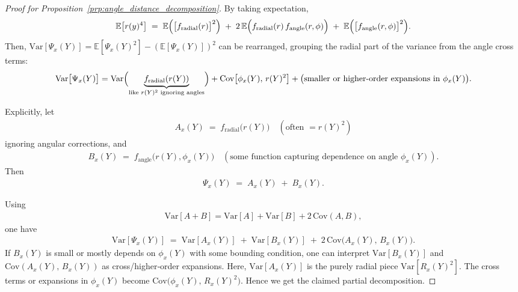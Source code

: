 \begin{proof}[Proof for Proposition~\ref{prp:angle_distance_decomposition}]
    By taking expectation,
    \begin{align*}
        \mathbb{E}\bigl[r(y)^4\bigr]
        \;=\;
        \mathbb{E}\Bigl(\bigl[f_{\mathrm{radial}}(r)\bigr]^2\Bigr)
        \;+\;
        2\,\mathbb{E}\Bigl( f_{\mathrm{radial}}(r)\,f_{\mathrm{angle}}(r,\phi)\Bigr)
        \;+\;
        \mathbb{E}\Bigl(\bigl[f_{\mathrm{angle}}(r,\phi)\bigr]^2\Bigr).
    \end{align*}
    Then, \(\mathrm{Var}[\Psi_x(Y)] = \mathbb{E}[\Psi_x(Y)^2] - (\mathbb{E}[\Psi_x(Y)])^2\) can be rearranged, grouping the radial part of the variance from the angle cross terms:
    \begin{align*}
        \mathrm{Var}\bigl[\Psi_x(Y)\bigr]
        =
        \mathrm{Var}\Bigl(\underbrace{f_{\mathrm{radial}}(r(Y))}_{\text{like }r(Y)^2\text{ ignoring angles}}\Bigr)
        +
        \mathrm{Cov}\bigl[\phi_x(Y),\,r(Y)^2\bigr]
        +
        \bigl(\text{smaller or higher‐order expansions in }\phi_x(Y)\bigr).
    \end{align*}

    Explicitly, let 
    \begin{align*}
        A_x(Y) \;=\; f_{\mathrm{radial}}\bigl(r(Y)\bigr)\quad(\text{often }=r(Y)^2)
    \end{align*}
   ignoring angular corrections, and
   \begin{align*}
       B_x(Y) \;=\; f_{\mathrm{angle}}\bigl(r(Y), \phi_x(Y)\bigr)
    \quad(\text{some function capturing dependence on angle }\phi_x(Y)).
   \end{align*}
   Then
   \begin{align*}
       \Psi_x(Y)
       \;=\;
       A_x(Y) \;+\; B_x(Y).
   \end{align*}

    Using
    \begin{align*}
        \mathrm{Var}[A+B] 
        = 
        \mathrm{Var}[A] + \mathrm{Var}[B] + 2\,\mathrm{Cov}(A,B),
    \end{align*}
    one have
    \begin{align*}
        \mathrm{Var}[\Psi_x(Y)]
        \;=\;
        \mathrm{Var}[A_x(Y)]
        \;+\;
        \mathrm{Var}[B_x(Y)]
        \;+\;
        2\,\mathrm{Cov}\bigl(A_x(Y),\,B_x(Y)\bigr).
    \end{align*}
    If \(B_x(Y)\) is small or mostly depends on \(\phi_x(Y)\) with some bounding condition, one can interpret \(\mathrm{Var}[B_x(Y)]\) and \(\mathrm{Cov}(A_x(Y),\,B_x(Y))\) as cross/higher‐order expansions.  
    Here, \(\mathrm{Var}[A_x(Y)]\) is the purely radial piece \(\mathrm{Var}[R_x(Y)^2]\). The cross terms or expansions in \(\phi_x(Y)\) become \(\mathrm{Cov}\bigl(\phi_x(Y),\,R_x(Y)^2\bigr)\).
    Hence we get the claimed partial decomposition.
\end{proof}

